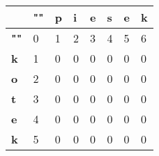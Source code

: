 \begin{table}[H]
	\center
	\begin{tabular}{|l|lllllll|}
		\hline
		& \multicolumn{1}{l|}{\textbf{""}} & \multicolumn{1}{l|}{\textbf{p}} & \multicolumn{1}{l|}{\textbf{i}} & \multicolumn{1}{l|}{\textbf{e}} & \multicolumn{1}{l|}{\textbf{s}} & \multicolumn{1}{l|}{\textbf{e}} & \multicolumn{1}{l|}{\textbf{k}} \\ \hline
		\textbf{""} & 0                                & 1                               & 2                               & 3                               & 4                               & 5                               & 6                               \\ \cline{1-1}
		\textbf{k}  & 1                                & 0                               & 0                               & 0                               & 0                               & 0                               & 0                               \\ \cline{1-1}
		\textbf{o}  & 2                                & 0                               & 0                               & 0                               & 0                               & 0                               & 0                               \\ \cline{1-1}
		\textbf{t}  & 3                                & 0                               & 0                               & 0                               & 0                               & 0                               & 0                               \\ \cline{1-1}
		\textbf{e}  & 4                                & 0                               & 0                               & 0                               & 0                               & 0                               & 0                               \\ \cline{1-1}
		\textbf{k}  & 5                                & 0                               & 0                               & 0                               & 0                               & 0                               & 0                               \\ \cline{1-1}
		\hline
	\end{tabular}
	\caption{}
	\label{tab_zad14}
\end{table}